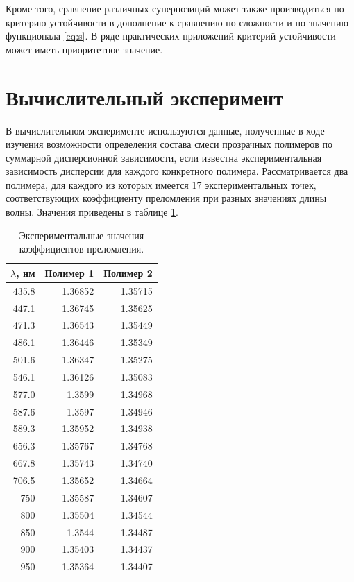 \documentclass[11pt,a4paper]{article}
\theoremstyle{definition}
\begin{document}
Кроме того, сравнение различных суперпозиций может также производиться по
критерию устойчивости в дополнение к сравнению по сложности и по значению
функционала \eqref{eq:s}. В ряде практических приложений критерий устойчивости
может иметь приоритетное значение.

\section{Вычислительный эксперимент}

В вычислительном эксперименте используются данные, полученные в ходе
изучения возможности определения состава смеси прозрачных
полимеров по суммарной дисперсионной зависимости, если известна экспериментальная
зависимость дисперсии для каждого конкретного полимера. Рассматривается два
полимера, для каждого из которых имеется 17 экспериментальных точек,
соответствующих коэффициенту преломления при разных значениях длины волны.
Значения приведены в таблице \ref{tabl:source_data}.

\begin{table}[h]
  \footnotesize
  \caption{Экспериментальные значения коэффициентов преломления.}
  \centering
  \begin{tabular}{r | r | r}
	$\lambda$, нм	& Полимер 1 & Полимер 2 \\ \hline
	435.8 & 1.36852 & 1.35715 \\
	447.1 & 1.36745 & 1.35625 \\
	471.3 & 1.36543 & 1.35449 \\
	486.1 & 1.36446 & 1.35349 \\
	501.6 & 1.36347 & 1.35275 \\
	546.1 & 1.36126 & 1.35083 \\
	577.0 & 1.3599 & 1.34968 \\
	587.6 & 1.3597 & 1.34946 \\
	589.3 & 1.35952 & 1.34938 \\
	656.3 & 1.35767 & 1.34768 \\
	667.8 & 1.35743 & 1.34740 \\
	706.5 & 1.35652 & 1.34664 \\
	750 & 1.35587 & 1.34607 \\
	800 & 1.35504 & 1.34544 \\
	850 & 1.3544 & 1.34487 \\
	900 & 1.35403 & 1.34437 \\
	950 & 1.35364 & 1.34407 \\
  \end{tabular}
  \label{tabl:source_data}
\end{table}
\end{document}
